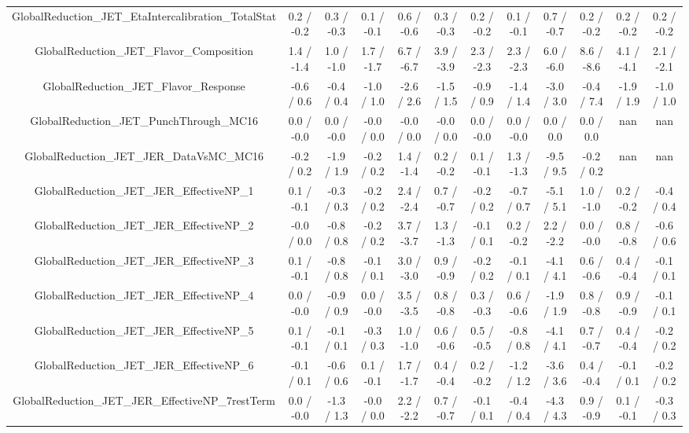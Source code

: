 \begin{table}[htbp]
\begin{center}
\begin{tabular}{|c|c|c|c|c|c|c|c|c|c|c|c|}
  GlobalReduction_JET_EtaIntercalibration_TotalStat & 0.2 / -0.2 & 0.3 / -0.3 & 0.1 / -0.1 & 0.6 / -0.6 & 0.3 / -0.3 & 0.2 / -0.2 & 0.1 / -0.1 & 0.7 / -0.7 & 0.2 / -0.2 & 0.2 / -0.2 & 0.2 / -0.2 \\ 
  GlobalReduction_JET_Flavor_Composition & 1.4 / -1.4 & 1.0 / -1.0 & 1.7 / -1.7 & 6.7 / -6.7 & 3.9 / -3.9 & 2.3 / -2.3 & 2.3 / -2.3 & 6.0 / -6.0 & 8.6 / -8.6 & 4.1 / -4.1 & 2.1 / -2.1 \\ 
  GlobalReduction_JET_Flavor_Response & -0.6 / 0.6 & -0.4 / 0.4 & -1.0 / 1.0 & -2.6 / 2.6 & -1.5 / 1.5 & -0.9 / 0.9 & -1.4 / 1.4 & -3.0 / 3.0 & -0.4 / 7.4 & -1.9 / 1.9 & -1.0 / 1.0 \\ 
  GlobalReduction_JET_PunchThrough_MC16 & 0.0 / -0.0 & 0.0 / -0.0 & -0.0 / 0.0 & -0.0 / 0.0 & -0.0 / 0.0 & 0.0 / -0.0 & 0.0 / -0.0 & 0.0 / 0.0 & 0.0 / 0.0 &    nan    &    nan    \\ 
  GlobalReduction_JET_JER_DataVsMC_MC16 & -0.2 / 0.2 & -1.9 / 1.9 & -0.2 / 0.2 & 1.4 / -1.4 & 0.2 / -0.2 & 0.1 / -0.1 & 1.3 / -1.3 & -9.5 / 9.5 & -0.2 / 0.2 &    nan    &    nan    \\ 
  GlobalReduction_JET_JER_EffectiveNP_1 & 0.1 / -0.1 & -0.3 / 0.3 & -0.2 / 0.2 & 2.4 / -2.4 & 0.7 / -0.7 & -0.2 / 0.2 & -0.7 / 0.7 & -5.1 / 5.1 & 1.0 / -1.0 & 0.2 / -0.2 & -0.4 / 0.4 \\ 
  GlobalReduction_JET_JER_EffectiveNP_2 & -0.0 / 0.0 & -0.8 / 0.8 & -0.2 / 0.2 & 3.7 / -3.7 & 1.3 / -1.3 & -0.1 / 0.1 & 0.2 / -0.2 & 2.2 / -2.2 & 0.0 / -0.0 & 0.8 / -0.8 & -0.6 / 0.6 \\ 
  GlobalReduction_JET_JER_EffectiveNP_3 & 0.1 / -0.1 & -0.8 / 0.8 & -0.1 / 0.1 & 3.0 / -3.0 & 0.9 / -0.9 & -0.2 / 0.2 & -0.1 / 0.1 & -4.1 / 4.1 & 0.6 / -0.6 & 0.4 / -0.4 & -0.1 / 0.1 \\ 
  GlobalReduction_JET_JER_EffectiveNP_4 & 0.0 / -0.0 & -0.9 / 0.9 & 0.0 / -0.0 & 3.5 / -3.5 & 0.8 / -0.8 & 0.3 / -0.3 & 0.6 / -0.6 & -1.9 / 1.9 & 0.8 / -0.8 & 0.9 / -0.9 & -0.1 / 0.1 \\ 
  GlobalReduction_JET_JER_EffectiveNP_5 & 0.1 / -0.1 & -0.1 / 0.1 & -0.3 / 0.3 & 1.0 / -1.0 & 0.6 / -0.6 & 0.5 / -0.5 & -0.8 / 0.8 & -4.1 / 4.1 & 0.7 / -0.7 & 0.4 / -0.4 & -0.2 / 0.2 \\ 
  GlobalReduction_JET_JER_EffectiveNP_6 & -0.1 / 0.1 & -0.6 / 0.6 & 0.1 / -0.1 & 1.7 / -1.7 & 0.4 / -0.4 & 0.2 / -0.2 & -1.2 / 1.2 & -3.6 / 3.6 & 0.4 / -0.4 & -0.1 / 0.1 & -0.2 / 0.2 \\ 
  GlobalReduction_JET_JER_EffectiveNP_7restTerm & 0.0 / -0.0 & -1.3 / 1.3 & -0.0 / 0.0 & 2.2 / -2.2 & 0.7 / -0.7 & -0.1 / 0.1 & -0.4 / 0.4 & -4.3 / 4.3 & 0.9 / -0.9 & 0.1 / -0.1 & -0.3 / 0.3 \\ 

\end{tabular}
\end{center}
\end{table}
